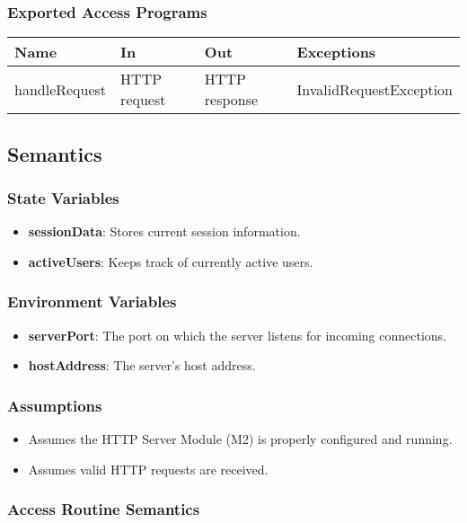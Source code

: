\documentclass[12pt, titlepage]{article}
\begin{document}
\subsubsection{Exported Access Programs}

\begin{center}
\begin{tabular}{p{2.5cm} p{3.5cm} p{3.5cm} p{3cm}}
\hline
\textbf{Name} & \textbf{In} & \textbf{Out} & \textbf{Exceptions} \\
\hline
handleRequest & HTTP request & HTTP response & InvalidRequestException \\
\hline
\end{tabular}
\end{center}
\subsection{Semantics}
\subsubsection{State Variables}
\begin{itemize}
  \item \textbf{sessionData}: Stores current session information.
  \item \textbf{activeUsers}: Keeps track of currently active users.
\end{itemize}
\subsubsection{Environment Variables}
\begin{itemize}
  \item \textbf{serverPort}: The port on which the server listens for incoming connections.
  \item \textbf{hostAddress}: The server's host address.
\end{itemize}
\subsubsection{Assumptions}
\begin{itemize}
  \item Assumes the HTTP Server Module (M2) is properly configured and running.
  \item Assumes valid HTTP requests are received.
\end{itemize}
\subsubsection{Access Routine Semantics}
\end{document}
